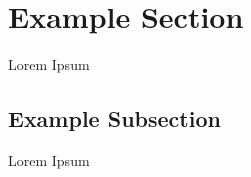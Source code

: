 \section{Example Section}
\label{sec:exampleSection}

Lorem Ipsum

\subsection{Example Subsection}
\label{subsec:exampleSubsection}

Lorem Ipsum